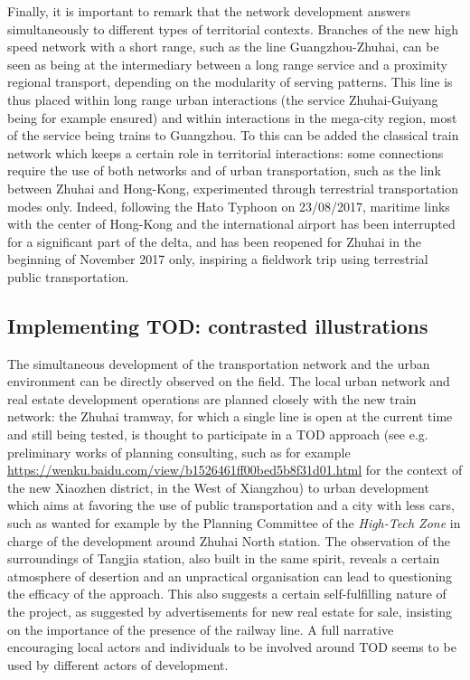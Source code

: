 Finally, it is important to remark that the network development answers simultaneously to different types of territorial contexts. Branches of the new high speed network with a short range, such as the line Guangzhou-Zhuhai, can be seen as being at the intermediary between a long range service and a proximity regional transport, depending on the modularity of serving patterns. This line is thus placed within long range urban interactions (the service Zhuhai-Guiyang being for example ensured) and within interactions in the mega-city region, most of the service being trains to Guangzhou. To this can be added the classical train network which keeps a certain role in territorial interactions: some connections require the use of both networks and of urban transportation, such as the link between Zhuhai and Hong-Kong, experimented through terrestrial transportation modes only. Indeed, following the Hato Typhoon on 23/08/2017, maritime links with the center of Hong-Kong and the international airport has been interrupted for a significant part of the delta, and has been reopened for Zhuhai in the beginning of November 2017 only, inspiring a fieldwork trip using terrestrial public transportation.


\subsection{Implementing TOD: contrasted illustrations}

The simultaneous development of the transportation network and the urban environment can be directly observed on the field. The local urban network and real estate development operations are planned closely with the new train network: the Zhuhai tramway, for which a single line is open at the current time and still being tested, is thought to participate in a TOD approach (see e.g. preliminary works of planning consulting, such as for example \url{https://wenku.baidu.com/view/b1526461ff00bed5b8f31d01.html} for the context of the new Xiaozhen district, in the West of Xiangzhou) to urban development which aims at favoring the use of public transportation and a city with less cars, such as wanted for example by the Planning Committee of the \emph{High-Tech Zone} in charge of the development around Zhuhai North station. The observation of the surroundings of Tangjia station, also built in the same spirit, reveals a certain atmosphere of desertion and an unpractical organisation can lead to questioning the efficacy of the approach. This also suggests a certain self-fulfilling nature of the project, as suggested by advertisements for new real estate for sale, insisting on the importance of the presence of the railway line. A full narrative encouraging local actors and individuals to be involved around TOD seems to be used by different actors of development.


